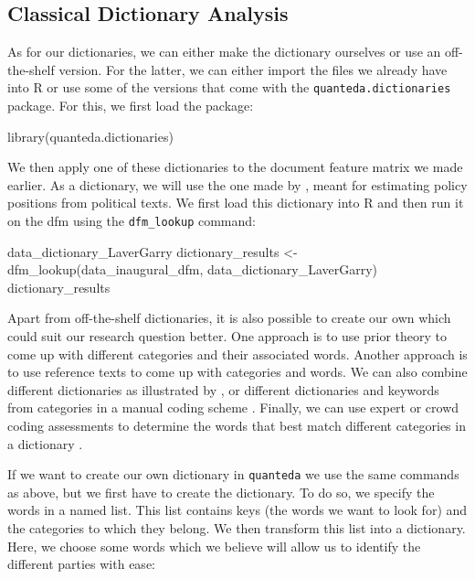\documentclass[
]{article}
\newenvironment{Shaded}{\begin{snugshade}}{\end{snugshade}}
\newcommand{\FunctionTok}[1]{\textcolor[rgb]{0.00,0.00,0.00}{#1}}
\newcommand{\NormalTok}[1]{#1}
\newcommand{\OtherTok}[1]{\textcolor[rgb]{0.56,0.35,0.01}{#1}}
\begin{document}
\hypertarget{classical-dictionary-analysis}{%
\subsection{Classical Dictionary Analysis}\label{classical-dictionary-analysis}}

As for our dictionaries, we can either make the dictionary ourselves or use an off-the-shelf version. For the latter, we can either import the files we already have into R or use some of the versions that come with the \texttt{quanteda.dictionaries} package. For this, we first load the package:

\begin{Shaded}
\begin{Highlighting}[]
\FunctionTok{library}\NormalTok{(quanteda.dictionaries)}
\end{Highlighting}
\end{Shaded}

We then apply one of these dictionaries to the document feature matrix we made earlier. As a dictionary, we will use the one made by \textcite{Laver2000a}, meant for estimating policy positions from political texts. We first load this dictionary into R and then run it on the dfm using the \texttt{dfm\_lookup} command:

\begin{Shaded}
\begin{Highlighting}[]
\NormalTok{data\_dictionary\_LaverGarry}
\NormalTok{dictionary\_results }\OtherTok{\textless{}{-}} \FunctionTok{dfm\_lookup}\NormalTok{(data\_inaugural\_dfm, data\_dictionary\_LaverGarry)}
\NormalTok{dictionary\_results}
\end{Highlighting}
\end{Shaded}

Apart from off-the-shelf dictionaries, it is also possible to create our own which could suit our research question better. One approach is to use prior theory to come up with different categories and their associated words. Another approach is to use reference texts to come up with categories and words. We can also combine different dictionaries as illustrated by \textcite{Young2012a}, or different dictionaries and keywords from categories in a manual coding scheme \autocite{Lind2019a}. Finally, we can use expert or crowd coding assessments to determine the words that best match different categories in a dictionary \autocite{Haselmayer2017a}.

If we want to create our own dictionary in \texttt{quanteda} we use the same commands as above, but we first have to create the dictionary. To do so, we specify the words in a named list. This list contains keys (the words we want to look for) and the categories to which they belong. We then transform this list into a dictionary. Here, we choose some words which we believe will allow us to identify the different parties with ease:
\end{document}
